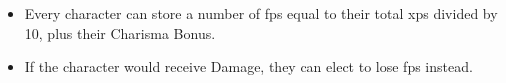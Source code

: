 \begin{itemize}
  \item
  Every character can store a number of \glspl{fp} equal to their total \glspl{xp} divided by 10, plus their Charisma Bonus.
  \item
  If the character would receive Damage, they can elect to lose \glspl{fp} instead.
\end{itemize}
